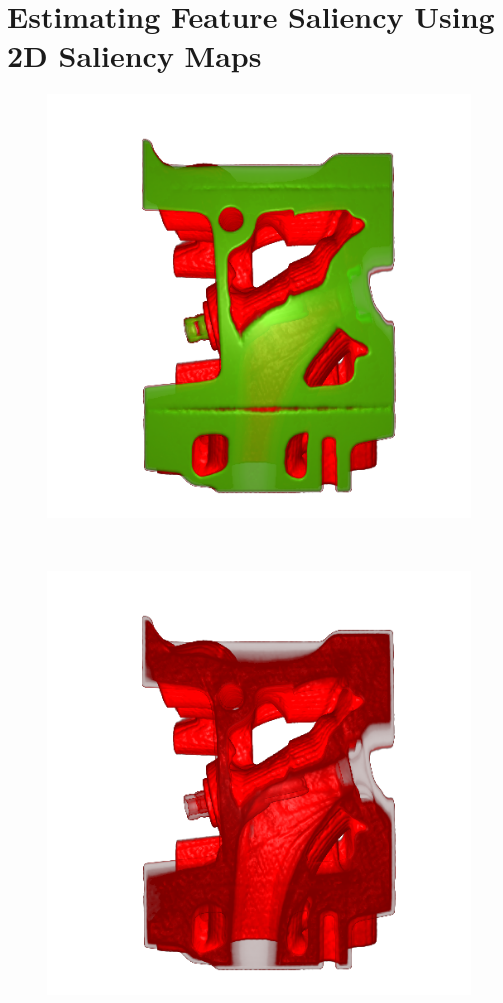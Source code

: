 \chapter{Estimating Feature Saliency Using 2D Saliency Maps \label{2d_saliency_map}}

\begin{figure}
	\centering
	\begin{minipage}{.33\textwidth}
		\includegraphics[width=1\linewidth]{images/engine_naive}
		\subcaption{}
	\end{minipage}~
	\begin{minipage}{.33\textwidth}
		\includegraphics[width=1\linewidth]{images/engine_naive_1}

\end{minipage}
\end{figure}
